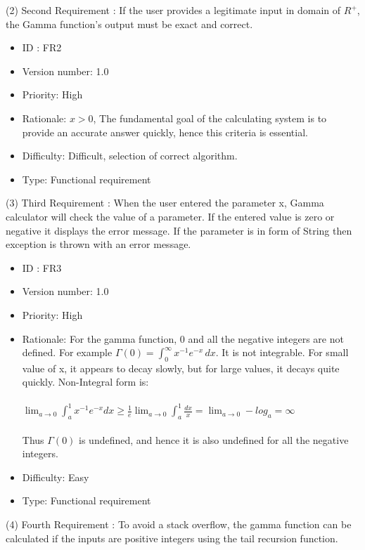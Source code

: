\documentclass[12pt,a4paper]{report}
\begin{document}
(2) Second Requirement : If the user provides a legitimate input in domain of $R^+$, the Gamma function's output must be exact and correct.

\begin{itemize}
    \item ID : FR2
    \item Version number: 1.0
    \item Priority: High
    \item Rationale: $x > 0$, The fundamental goal of the calculating system is to provide an accurate answer quickly, hence this criteria is essential.
    \item Difficulty: Difficult, selection of correct algorithm.
    \item Type: Functional requirement
\end{itemize}

(3) Third Requirement : When the user entered the parameter x, Gamma calculator will check the value of a parameter. If the entered value is zero or negative it displays the error message. If the parameter is in form of String then exception is thrown with an error message.

\begin{itemize}
    \item ID : FR3
    \item Version number: 1.0
    \item Priority: High
    \item Rationale: For the gamma function, 0 and all the negative integers are not defined. For example ${\displaystyle \Gamma (0)=\int _{0}^{\infty }x^{-1}e^{-x}\,dx}$. It is not integrable. For small value of x, it appears to decay slowly, but for large values, it decays quite quickly. Non-Integral form is: \\\\
     $\lim_{a \to 0}\int _{a}^{1}x^{-1}e^{-x}dx \geq \frac{1}{e}\lim_{a \to 0}\int _{a}^{1} \frac{dx}{x}=\lim_{a \to 0}-log_a=\infty$ \\\\
    Thus $\Gamma \left( 0 \right)$ is undefined, and hence it is also undefined for all the negative integers.
    \item Difficulty: Easy
    \item Type: Functional requirement
\end{itemize}

(4) Fourth Requirement : To avoid a stack overflow, the gamma function can be calculated if the inputs are positive integers using the tail recursion function.
\end{document}
